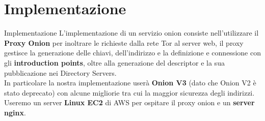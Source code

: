 \section{Implementazione}
\begin{frame}{Implementazione}
    L'implementazione di un servizio onion consiste nell'utilizzare il \textbf{Proxy Onion} per inoltrare le richieste dalla rete Tor al server web, il proxy gestisce la generazione delle chiavi, dell'indirizzo e la definizione e connessione con gli \textbf{introduction points}, oltre alla generazione del descriptor e la sua pubblicazione nei Directory Servers. \\
    In particolare la nostra implementazione userà \textbf{Onion V3} (dato che Onion V2 è stato deprecato) con alcune migliorie tra cui la maggior sicurezza degli indirizzi. \\
    Useremo un server \textbf{Linux EC2} di AWS per ospitare il proxy onion e un \textbf{server nginx}.
\end{frame}

\begin{frame}

\end{frame}